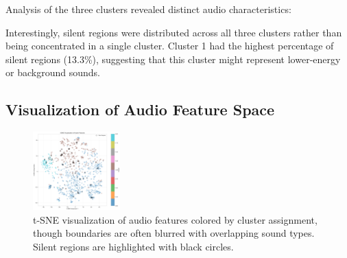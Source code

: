 \documentclass{article}
\begin{document}
Analysis of the three clusters revealed distinct audio characteristics:

\begin{table}[H]
  \caption{Characteristics of the three audio feature clusters}
  \label{tab:cluster_chars}
  \centering
\end{table}

Interestingly, silent regions were distributed across all three clusters rather than being concentrated in a single cluster. Cluster 1 had the highest percentage of silent regions (13.3\%), suggesting that this cluster might represent lower-energy or background sounds.

\subsection{Visualization of Audio Feature Space}

\begin{figure}[H]
  \centering
  \includegraphics[width=0.3\textwidth]{figures/audio_features/tsne_visualization.png}
  \caption{t-SNE visualization of audio features colored by cluster assignment, though boundaries are often blurred with overlapping sound types. Silent regions are highlighted with black circles.}
  \label{fig:tsne}
\end{figure}
\end{document}
